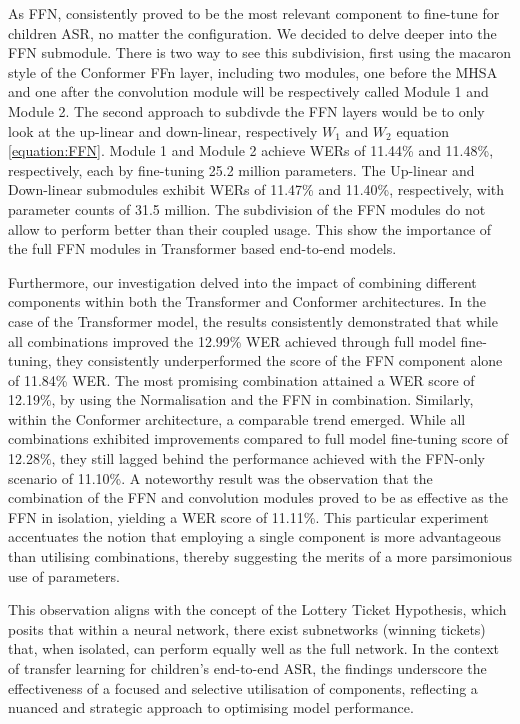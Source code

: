 As FFN, consistently proved to be the most relevant component to fine-tune for children ASR, no matter the configuration. We decided to delve deeper into the FFN submodule. There is two way to see this subdivision, first using the macaron style of the Conformer FFn layer, including two modules, one before the MHSA and one after the convolution module will be respectively called Module 1 and Module 2. The second approach to subdivde the FFN layers would be to only look at the up-linear and down-linear, respectively $W_1$ and $W_2$ equation \ref{equation:FFN}. Module 1 and Module 2 achieve WERs of 11.44\% and 11.48\%, respectively, each by fine-tuning 25.2 million parameters. The Up-linear and Down-linear  submodules exhibit WERs of 11.47\% and 11.40\%, respectively, with parameter counts of 31.5 million. The subdivision of the FFN modules do not allow to perform better than their coupled usage. This show the importance of the full FFN modules in Transformer based end-to-end models. 

Furthermore, our investigation delved into the impact of combining different components within both the Transformer and Conformer architectures. In the case of the Transformer model, the results consistently demonstrated that while all combinations improved the 12.99\% WER achieved through full model fine-tuning, they consistently underperformed the score of the FFN component alone of 11.84\% WER. The most promising combination attained a WER score of 12.19\%, by using the Normalisation and the FFN in combination.
Similarly, within the Conformer architecture, a comparable trend emerged. While all combinations exhibited improvements compared to full model fine-tuning score of 12.28\%, they still lagged behind the performance achieved with the FFN-only scenario of 11.10\%. A noteworthy result was the observation that the combination of the FFN and convolution modules proved to be as effective as the FFN in isolation, yielding a WER score of 11.11\%. This particular experiment accentuates the notion that employing a single component is more advantageous than utilising combinations, thereby suggesting the merits of a more parsimonious use of parameters.

This observation aligns with the concept of the Lottery Ticket Hypothesis, which posits that within a neural network, there exist subnetworks (winning tickets) that, when isolated, can perform equally well as the full network. In the context of transfer learning for children's end-to-end ASR, the findings underscore the effectiveness of a focused and selective utilisation of components, reflecting a nuanced and strategic approach to optimising model performance.

